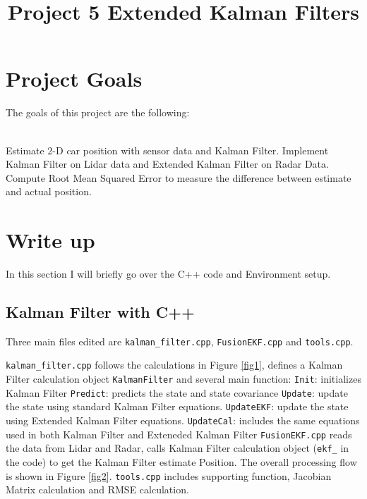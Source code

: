 \documentclass{article}
\title{Project 5 Extended Kalman Filters}
\begin{document}
\maketitle
\section{Project Goals}

The goals of this project are the following:\\\\
\begin{outline}[enumerate]
 \1 Estimate 2-D car position with sensor data and Kalman Filter.
 \1 Implement Kalman Filter on Lidar data and Extended Kalman Filter on Radar Data.
 \1 Compute Root Mean Squared Error to measure the difference between estimate and actual position.
\end{outline}

\section{Write up}
In this section I will briefly go over the C++ code and Environment setup. \\
\subsection{Kalman Filter with C++ } 
Three main files edited are \verb|kalman_filter.cpp|, \verb|FusionEKF.cpp| and \verb|tools.cpp|.\\

\begin{outline}[enumerate]
 \1 \verb|kalman_filter.cpp| follows the calculations in Figure \ref{fig1}, defines a Kalman Filter calculation object \verb|KalmanFilter| and several main function:
   \2 \verb|Init|: initializes Kalman Filter
   \2 \verb|Predict|: predicts the state and state covariance
   \2 \verb|Update|: update the state using standard Kalman Filter equations.
   \2 \verb|UpdateEKF|: update the state using Extended Kalman Filter equations.
   \2 \verb|UpdateCal|: includes the same equations used in both Kalman Filter and Exteneded Kalman Filter
\1 \verb|FusionEKF.cpp| reads the data from Lidar and Radar, calls Kalman Filter calculation object (\verb|ekf_| in the code) to get the Kalman Filter estimate Position. The overall processing flow is shown in Figure \ref{fig2}.
\1 \verb|tools.cpp| includes supporting function, Jacobian Matrix calculation and RMSE calculation.
\end{outline}
\end{document}
